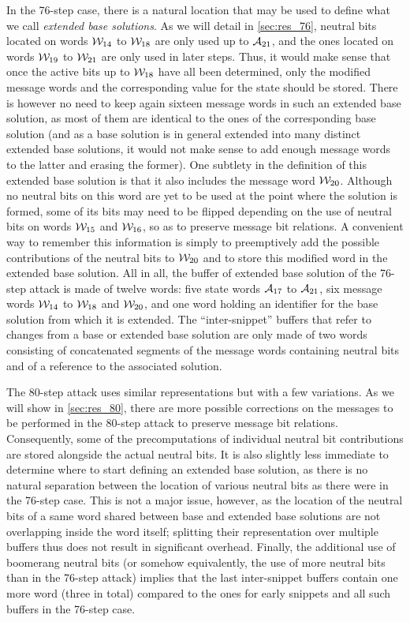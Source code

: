 In the 76-step case, there is a natural location that may be used to define what we call \emph{extended base solutions}. As we will detail in
\autoref{sec:res_76}, neutral bits located on words $\mathcal{W}_{14}$ to $\mathcal{W}_{18}$ are only used up to $\mathcal{A}_{21}$, and the ones located
on words $\mathcal{W}_{19}$ to $\mathcal{W}_{21}$ are only used in later steps. Thus, it would make sense that once the active bits up to
$\mathcal{W}_{18}$ have all been determined, only the modified message words and the corresponding value for the state should be stored. There is
however no need to keep again sixteen message words in such an extended base solution, as most of them are identical to the ones of the corresponding
base solution (and as a base solution is in general extended into many distinct extended base solutions, it would not make sense to \eg add enough
message words to the latter and erasing the former). One subtlety in the definition of this extended base solution is that
it also includes the message word $\mathcal{W}_{20}$. Although no neutral bits on this word are yet to be used at the point where the solution is
formed, some of its bits may need to be flipped depending on the use of neutral bits on words $\mathcal{W}_{15}$ and $\mathcal{W}_{16}$, so as to
preserve message bit relations. A convenient way to remember this information is simply to preemptively add the possible contributions of the neutral
bits to $\mathcal{W}_{20}$ and to store this modified word in the extended base solution.
All in all, the buffer of extended base solution of the 76-step attack is made of twelve words: five state words $\mathcal{A}_{17}$ to $\mathcal{A}_{21}$,
six message words $\mathcal{W}_{14}$ to $\mathcal{W}_{18}$ and $\mathcal{W}_{20}$, and one word holding an identifier for the base solution from which
it is extended.
The ``inter-snippet'' buffers that refer to changes from a base or extended base solution are only made of two words consisting of concatenated
segments of the message words containing neutral bits and of a reference to the associated solution.

The 80-step attack uses similar representations but with a few variations. As we will show in \autoref{sec:res_80}, there are
more possible corrections on the messages to be performed in the 80-step attack to preserve message bit relations. Consequently, some of the precomputations of
individual neutral bit contributions are stored alongside the actual neutral bits. It is also slightly less immediate to determine where to
start defining an extended base solution, as there is no natural separation between the location of various neutral bits as there were in
the 76-step case. This is not a major issue, however, as the location of the neutral bits of a same word shared between base and extended base solutions
are not overlapping inside the word itself; splitting their representation over multiple buffers thus does not result in significant overhead.
Finally, the additional use of boomerang neutral bits (or somehow equivalently, the use of more neutral bits than in the 76-step attack)
implies that the last inter-snippet buffers contain one more word (\ie three in total) compared to the ones for early snippets and all such buffers
in the 76-step case.

